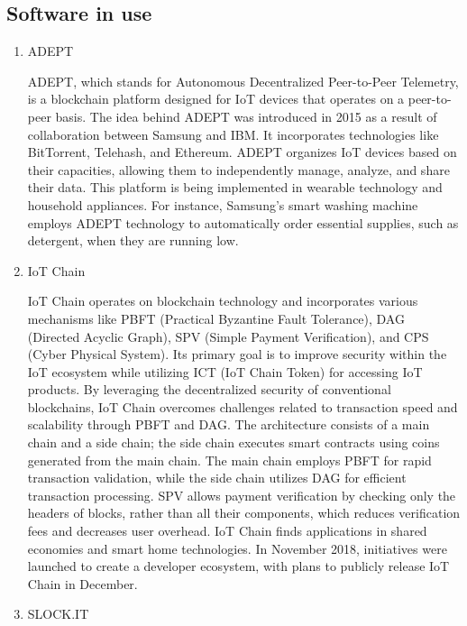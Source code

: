 \documentclass[conference]{IEEEtran}
\begin{document}
\subsection{Software in use}

\begin{enumerate}[itemsep=2ex, parsep=1ex]
		
	\item ADEPT
	      
	      
	      ADEPT, which stands for Autonomous Decentralized Peer-to-Peer Telemetry, is a blockchain platform designed for IoT devices that operates on a peer-to-peer basis. The idea behind ADEPT was introduced in 2015 as a result of collaboration between Samsung and IBM. It incorporates technologies like BitTorrent, Telehash, and Ethereum. ADEPT organizes IoT devices based on their capacities, allowing them to independently manage, analyze, and share their data. This platform is being implemented in wearable technology and household appliances. For instance, Samsung's smart washing machine employs ADEPT technology to automatically order essential supplies, such as detergent, when they are running low.
	      
	\item IoT Chain
	      
	      
	      IoT Chain operates on blockchain technology and incorporates various mechanisms like PBFT (Practical Byzantine Fault Tolerance), DAG (Directed Acyclic Graph), SPV (Simple Payment Verification), and CPS (Cyber Physical System). Its primary goal is to improve security within the IoT ecosystem while utilizing ICT (IoT Chain Token) for accessing IoT products. By leveraging the decentralized security of conventional blockchains, IoT Chain overcomes challenges related to transaction speed and scalability through PBFT and DAG. The architecture consists of a main chain and a side chain; the side chain executes smart contracts using coins generated from the main chain. The main chain employs PBFT for rapid transaction validation, while the side chain utilizes DAG for efficient transaction processing. SPV allows payment verification by checking only the headers of blocks, rather than all their components, which reduces verification fees and decreases user overhead. IoT Chain finds applications in shared economies and smart home technologies. In November 2018, initiatives were launched to create a developer ecosystem, with plans to publicly release IoT Chain in December.
	      
	\item SLOCK.IT
	      

\end{enumerate}
\end{document}
